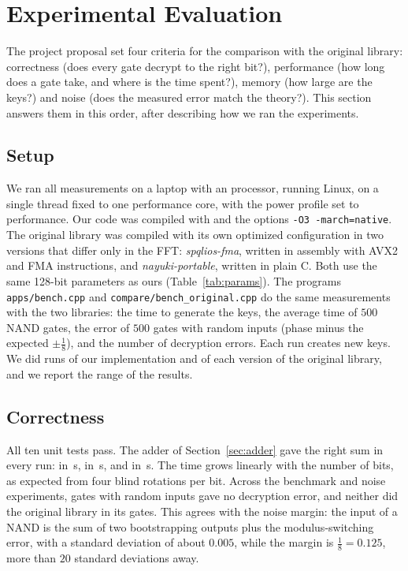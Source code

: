 \documentclass[12pt]{article}
\theoremstyle{plain}
\theoremstyle{definition}
\newcommand{\code}[1]{\texttt{#1}}
\begin{document}
\section{Experimental Evaluation}
\label{sec:eval}

The project proposal set four criteria for the comparison with the original
library: correctness (does every gate decrypt to the right bit?), performance
(how long does a gate take, and where is the time spent?), memory (how large
are the keys?) and noise (does the measured error match the theory?). This
section answers them in this order, after describing how we ran the
experiments.

\subsection{Setup}

We ran all measurements on a laptop with an \CPU{} processor, running Linux,
on a single thread fixed to one performance core, with the power profile set to
performance. Our code was compiled with \Compiler{} and the options
\code{-O3 -march=native}. The original library \cite{tfhelib} was compiled with
its own optimized configuration in two versions that differ only in the FFT:
\emph{spqlios-fma}, written in assembly with AVX2 and FMA instructions, and
\emph{nayuki-portable}, written in plain C. Both use the same 128-bit parameters
as ours (Table~\ref{tab:params}). The programs \code{apps/bench.cpp} and
\code{compare/bench\_original.cpp} do the same measurements with the two
libraries: the time to generate the keys, the average time of $500$ NAND gates,
the error of $500$ gates with random inputs (phase minus the expected
$\pm\frac18$), and the number of decryption errors. Each run creates new keys.
We did \OurRuns{} runs of our implementation and \OrigRuns{} of each version of
the original library, and we report the range of the results.

\subsection{Correctness}

All ten unit tests pass. The adder of Section~\ref{sec:adder} gave the right
sum in every run: \AdderEightText{} in \AdderEight\,s, \AdderSixteenText{} in
\AdderSixteen\,s, and \AdderTwentyFourText{} in \AdderTwentyFour\,s. The time
grows linearly with the number of bits, as expected from four blind rotations
per bit. Across the benchmark and noise experiments, \TotalGates{} gates with
random inputs gave no decryption error, and neither did the original library in
its \OrigGates{} gates. This agrees with the noise margin: the input of a NAND
is the sum of two bootstrapping outputs plus the modulus-switching error, with
a standard deviation of about $0.005$, while the margin is $\frac18=0.125$,
more than $20$ standard deviations away.
\end{document}
